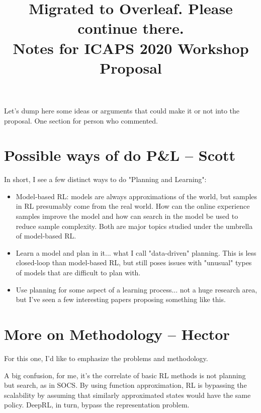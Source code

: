 \documentclass[10pt]{article}
\begin{document}
\title{Migrated to Overleaf. Please continue there.\\ \vspace*{0.7cm}Notes for ICAPS 2020 Workshop Proposal}
\date{}

\author{}

\maketitle

Let's dump here some ideas or arguments that could make it or not into the proposal.
One section for person who commented.

\section*{Possible ways of do P\&L -- Scott}
In short, I see a few distinct ways to do "Planning and Learning":

\begin{itemize}
\item Model-based RL: models are always approximations of the world, but samples in RL presumably come from the real world.  How can the online experience samples improve the model and how can search in the model be used to reduce sample complexity.  Both are major topics studied under the umbrella of model-based RL.
\item Learn a model and plan in it... what I call "data-driven" planning.  This is less closed-loop than model-based RL, but still poses issues with "unusual" types of models that are difficult to plan with.
\item Use planning for some aspect of a learning process... not a huge research area, but I've seen a few interesting papers proposing something like this.
\end{itemize}

\section*{More on Methodology – Hector}

For this one, I'd like to emphasize the problems and methodology.

A big confusion, for me, it's the correlate of basic RL methods is not planning but search, as in SOCS.
By using function approximation, RL is bypassing the scalability
by assuming that similarly approximated states would have the same policy.
DeepRL, in turn, bypass the representation problem.
\end{document}
